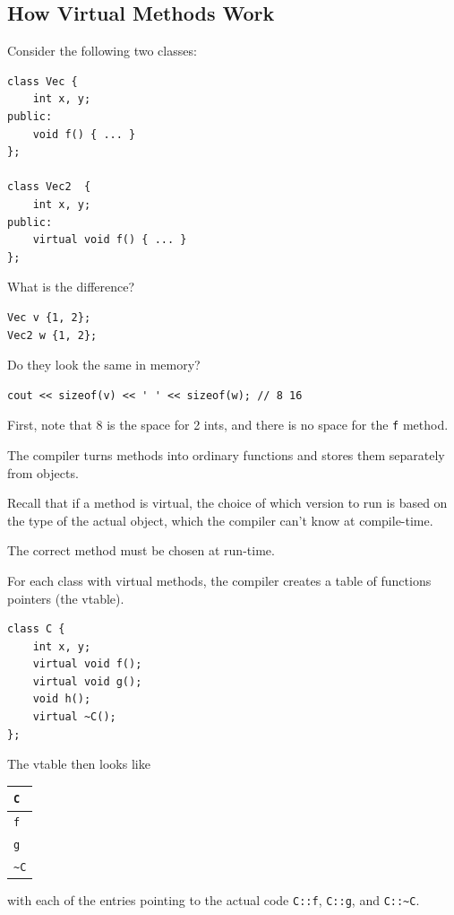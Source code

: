 \documentclass[11pt]{article}
\theoremstyle{definition}
\begin{document}
\subsection{How Virtual Methods Work}
Consider the following two classes:
\begin{lstlisting}
class Vec {
    int x, y;
public:
    void f() { ... }
};

class Vec2  {
    int x, y;
public:
    virtual void f() { ... }
};
\end{lstlisting}\vspace{-1.5ex}
What is the difference?
\begin{lstlisting}
Vec v {1, 2};
Vec2 w {1, 2};
\end{lstlisting}\vspace{-1.5ex}
Do they look the same in memory?
\begin{lstlisting}
cout << sizeof(v) << ' ' << sizeof(w); // 8 16
\end{lstlisting}\vspace{-1.5ex}
First, note that 8 is the space for 2 ints, and there is no space for the {\tt f} method.

The compiler turns methods into ordinary functions and stores them separately from objects.

Recall that if a method is virtual, the choice of which version to run is based on the type of the actual object, which the compiler can't know at compile-time.

The correct method must be chosen at run-time.

For each class with virtual methods, the compiler creates a table of functions pointers (the vtable). 
\begin{lstlisting}
class C {
    int x, y;
    virtual void f();
    virtual void g();
    void h();
    virtual ~C();
};
\end{lstlisting}\vspace{-1.5ex}
The vtable then looks like
\begin{table}[h]
\centering
\begin{tabular}{|l|}
\hline
{\tt C}  \\ \hline
{\tt f}  \\ \hline
{\tt g}  \\ \hline
\texttt{\~{}C} \\
\hline
\end{tabular}
\end{table}

with each of the entries pointing to the actual code {\tt C::f}, {\tt C::g}, and {\tt C::\~{}C}. 
\end{document}

